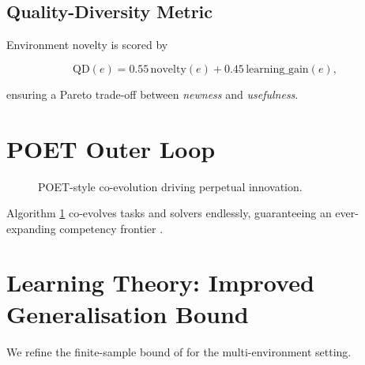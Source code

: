 \subsection{Quality-Diversity Metric}

Environment novelty is scored by

\[
\mathrm{QD}(e)=
0.55\,\mathrm{novelty}(e)+0.45\,\mathrm{learning\_gain}(e),
\]

ensuring a Pareto trade-off between \emph{newness} and \emph{usefulness}.

\section{POET Outer Loop}

\begin{figure}[ht]\centering
{}
\caption{POET-style co-evolution driving perpetual innovation.}
\label{fig:poet}
\end{figure}

Algorithm \ref{fig:poet} co-evolves tasks and solvers endlessly, guaranteeing
an ever-expanding competency frontier \parencite{jiang2019pddie}.

\section{Learning Theory: Improved Generalisation Bound}\label{sec:theory}

We refine the finite-sample bound of \textcite{bartlett2002rademacher} for the
multi-environment setting.

